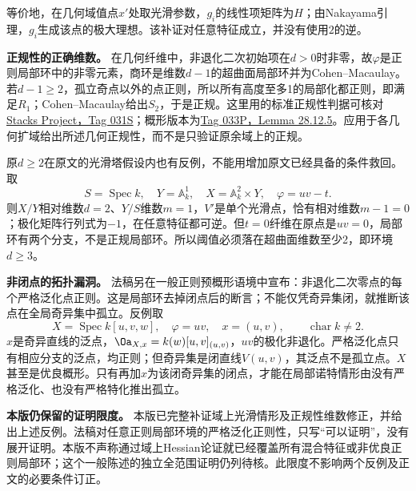 \documentclass[UTF8,a4paper]{ctexbook}
\DeclareMathOperator{\Spec}{Spec}
\begin{document}
等价地，在几何域值点$x'$处取光滑参数，$g_i$的线性项矩阵为$H$；由Nakayama引理，$g_i$生成该点的极大理想。该补证对任意特征成立，并没有使用$2$的逆。

\noindent\textbf{正规性的正确维数。}
在几何纤维中，非退化二次初始项在$d>0$时非零，故$\varphi$是正则局部环中的非零元素，商环是维数$d-1$的超曲面局部环并为Cohen--Macaulay。若$d-1\ge2$，孤立奇点以外的点正则，所以所有高度至多1的局部化都正则，即满足$R_1$；Cohen--Macaulay给出$S_2$，于是正规。这里用的标准正规性判据可核对\href{https://stacks.math.columbia.edu/tag/031S}{Stacks Project，Tag 031S}；概形版本为\href{https://stacks.math.columbia.edu/tag/033P}{Tag 033P，Lemma 28.12.5}。应用于各几何扩域给出所述几何正规性，而不是只验证原余域上的正规。

原$d\ge2$在原文的光滑塔假设内也有反例，不能用增加原文已经具备的条件救回。取
\[
 S=\Spec k,\quad Y=\mathbb A^1_k,
 \quad X=\mathbb A^2_k\times Y,\quad\varphi=uv-t.
\]
则$X/Y$相对维数$d=2$、$Y/S$维数$m=1$，$V'$是单个光滑点，恰有相对维数$m-1=0$；极化矩阵行列式为$-1$，在任意特征都可逆。但$t=0$纤维在原点是$uv=0$，局部环有两个分支，不是正规局部环。所以阈值必须落在超曲面维数至少2，即环境$d\ge3$。

\noindent\textbf{非闭点的拓扑漏洞。}
法稿另在一般正则预概形语境中宣布：非退化二次零点的每个严格泛化点正则。这是局部环去掉闭点后的断言；不能仅凭奇异集闭，就推断该点在全局奇异集中孤立。反例取
\[
 X=\Spec k[u,v,w],\quad\varphi=uv,\quad
 x=(u,v),\qquad\operatorname{char}k\ne2.
\]
$x$是奇异直线的泛点，$\Oa_{X,x}=k(w)[u,v]_{(u,v)}$，$uv$的极化非退化。严格泛化点只有相应分支的泛点，均正则；但奇异集是闭直线$V(u,v)$，其泛点不是孤立点。$X$甚至是优良概形。只有再加$x$为该闭奇异集的闭点，才能在局部诺特情形由没有严格泛化、也没有严格特化推出孤立。

\noindent\textbf{本版仍保留的证明限度。}
本版已完整补证域上光滑情形及正规性维数修正，并给出上述反例。法稿对任意正则局部环境的严格泛化正则性，只写“可以证明”，没有展开证明。本版不声称通过域上Hessian论证就已经覆盖所有混合特征或非优良正则局部环；这个一般陈述的独立全范围证明仍列待核。此限度不影响两个反例及正文的必要条件订正。
\end{document}
